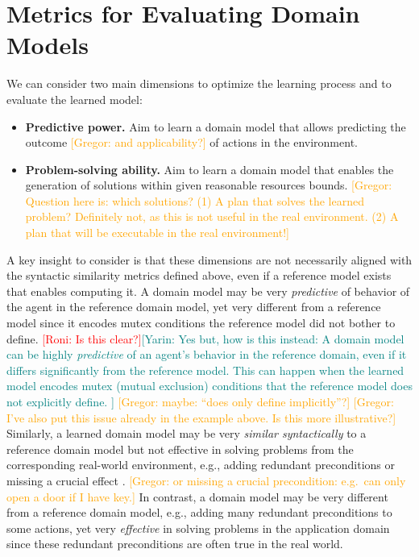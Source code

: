 \documentclass{article}
\theoremstyle{definition}
\theoremstyle{remark}
\newcommand{\roni}[1]{{\textcolor{red}{[Roni: #1]}}}
\newcommand{\mauro}[1]{{\textcolor{green}{[Mauro: #1]}}}
\newcommand{\yarin}[1]{{\textcolor{teal}{[Yarin: #1]}}}
\newcommand{\gregor}[1]{{\textcolor{orange}{[Gregor: #1]}}}
\begin{document}
\section{Metrics for Evaluating Domain Models}

We can consider two main dimensions to optimize the learning process and to evaluate the learned model:
%
\begin{itemize}
    \item \textbf{Predictive power.} Aim to learn a domain model that allows predicting the outcome \gregor{and applicability?} of actions in the environment. 
    \item \textbf{Problem-solving ability.} Aim to learn a domain model that enables the generation of solutions within given reasonable resources bounds. %
    \gregor{Question here is: which solutions? (1) A plan that solves the learned problem? Definitely not, as this is not useful in the real environment. (2) A plan that will be executable in the real environment!}
\end{itemize}


A key insight to consider 
is that these dimensions are not necessarily aligned with the syntactic similarity metrics defined above, even if a reference model exists that enables computing it.  
A domain model may be very \emph{predictive} of 
behavior of the agent in the reference domain model, yet very different from a reference model since it encodes mutex conditions the reference model did not bother to define. \roni{Is this clear?}\yarin{Yes but, how is this instead: A domain model can be highly \emph{predictive} of an agent's behavior in the reference domain, even if it differs significantly from the reference model. This can happen when the learned model encodes mutex (mutual exclusion) conditions that the reference model does not explicitly define.
}
\gregor{maybe: ``does only define implicitly''?} \gregor{I've also put this issue already in the example above. Is this more illustrative?}
Similarly, a learned domain model may be very \emph{similar syntactically} to a reference domain model but not effective in solving problems from the corresponding real-world environment, 
e.g., adding redundant preconditions or missing a crucial effect \citep{DBLP:conf/kcap/VallatiC19}. \gregor{or missing a crucial precondition: e.g.\ can only open a door if I have key.}
In contrast, a domain model may be very different from a reference domain model, e.g., adding many redundant preconditions to some actions, yet very \emph{effective} in solving problems in the application domain since these redundant preconditions are often true in the real world. 
\end{document}
